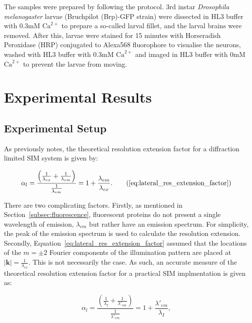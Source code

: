 The samples were prepared by following the 
protocol\cite{brent2009drosophila}. 3rd instar \textit{Drosophila 
melanogaster} larvae (Bruchpilot (Brp)-GFP strain) were dissected in HL3 
buffer with 0.3mM $\text{Ca}^{2+}$ to prepare a so-called larval fillet,
and the larval brains were removed. After this, larvae were stained for 15 
minutes with Horseradish Peroxidase (HRP) conjugated to Alexa568 
fluorophore to visualise the neurons, washed with HL3 buffer with 0.3mM 
$\text{Ca}^{2+}$ and imaged in HL3 buffer with 0mM $\text{Ca}^{2+}$ to 
prevent the larvae from moving.

\section{Experimental Results}
\label{sec:DeepSIM_results}

\subsection{Experimental Setup}
\label{subsec:DeepSIM_setup}

As previously notes, the theoretical resolution extension factor for 
a diffraction limited SIM system is given by:

\begin{equation}
\alpha_{l} = \frac{\left(\frac{1}{\lambda_{ex}} + \frac{1}{\lambda_{em}}\right)}{\frac{1}{\lambda_{em}}} = 1 + \frac{\lambda_{em}}{\lambda_{ex}}.\tag{\ref{eq:lateral_res_extension_factor}}
\end{equation}

There are two complicating factors. Firstly, as mentioned in 
Section~\ref{subsec:fluorescence}, fluorescent proteins do not present 
a single wavelength of emission, $\lambda_{em}$ but rather have an 
emission spectrum. For simplicity, the peak of the emission spectrum is
used to calculate the resolution extension. Secondly, 
Equation~\ref{eq:lateral_res_extension_factor} assumed that the locations
of the $m=\pm2$ Fourier components of the illumination pattern are placed
at $\left|\textbf{k}\right| = \frac{1}{\lambda_{ex}}$. This is not 
necessarily the case. As such, an accurate measure of the theoretical
resolution extension factor for a practical SIM implmentation is given as:

\begin{equation}\label{eq:lateral_res_extension_factor_real}
\alpha_{l} = \frac{\left(\frac{1}{\lambda_{I}} + \frac{1}{\lambda'_{em}}\right)}{\frac{1}{\lambda'_{em}}} = 1 + \frac{\lambda'_{em}}{\lambda_{I}},
\end{equation}

